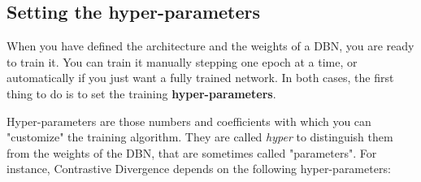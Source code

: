 \documentclass[a4paper]{article}
\begin{document}
		
	\subsection{Setting the hyper-parameters}

		
When you have defined the architecture and the weights of a DBN, you are ready to train it. You can train it manually stepping one epoch at a time, or automatically if you just want a fully trained network. In both cases, the first thing to do is to set the training \textbf{hyper-parameters}.
		
Hyper-parameters are those numbers and coefficients with which you can "customize" the training algorithm. They are called \emph{hyper} to distinguish them from the weights of the DBN, that are sometimes called "parameters". For instance, Contrastive Divergence depends on the following hyper-parameters:
		
\end{document}
